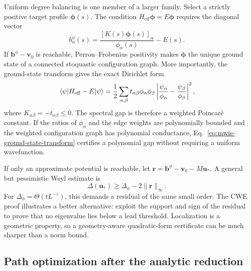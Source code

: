 Uniform degree balancing is one member of a larger family.  Select a strictly
positive target profile $\boldsymbol\phi(s)$.  The condition
$H_{\mathrm{eff}}\boldsymbol\phi=E\boldsymbol\phi$ requires the diagonal
vector
\begin{equation}
 b_\alpha^{\phi}(s)
 =\frac{[K(s)\boldsymbol\phi(s)]_\alpha}{\phi_\alpha(s)}-E(s).
 \label{eq:mwis-positive-profile}
\end{equation}
If $\mathbf b^\phi-\mathbf v_0$ is reachable, Perron--Frobenius positivity
makes $\boldsymbol\phi$ the unique ground state of a connected stoquastic
configuration graph.  More importantly, the ground-state transform gives the
exact Dirichlet form
\begin{equation}
 \matrixel{\psi}{H_{\mathrm{eff}}-E}{\psi}
 =\frac12\sum_{\alpha,\beta}
 t_{\alpha\beta}\phi_\alpha\phi_\beta
 \left|
 \frac{\psi_\alpha}{\phi_\alpha}
 -\frac{\psi_\beta}{\phi_\beta}
 \right|^2,
 \label{eq:mwis-ground-state-transform}
\end{equation}
where $K_{\alpha\beta}=-t_{\alpha\beta}\leq0$.  The spectral gap is therefore
a weighted Poincar\'e constant.  If the ratios of $\phi_\alpha$ and the edge
weights are polynomially bounded and the weighted configuration graph has
polynomial conductance, Eq.~\eqref{eq:mwis-ground-state-transform} certifies a
polynomial gap without requiring a uniform wavefunction.

If only an approximate potential is reachable, let
$\mathbf r=\mathbf b^\phi-\mathbf v_0-M\mathbf u_*$.  A general but
pessimistic Weyl estimate is
\begin{equation}
 \Delta(\mathbf u_*)
 \geq\Delta_\phi-2\|\mathbf r\|_\infty.
 \label{eq:mwis-residual-weyl}
\end{equation}
For $\Delta_\phi=\Theta(tL^{-z})$, this demands a residual of the same small
order.  The CWE proof illustrates a better alternative: exploit the support
and sign of the residual to prove that no eigenvalue lies below a lead
threshold.  Localization is a geometric property, so a geometry-aware
quadratic-form certificate can be much sharper than a norm bound.

\subsection{Path optimization after the analytic reduction}

